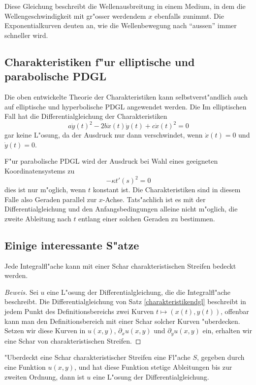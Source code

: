 Diese Gleichung beschreibt die Wellenausbreitung in einem Medium,
in dem die Wellengeschwindigkeit mit gr"osser werdendem $x$ ebenfalls
zunimmt. Die Exponentialkurven deuten an, wie die Wellenbewegung nach ``aussen''
immer schneller wird.

\subsection{Charakteristiken f"ur elliptische und parabolische PDGL}
Die oben entwickelte Theorie der Charakteristiken kann selbstverst"andlich
auch auf elliptische und hyperbolische PDGL angewendet werden. Die
Im elliptischen Fall hat die Differentialgleichung der Charakteristiken
\[
a\dot y(t)^2-2b\dot x(t)\dot y(t)+c\dot x(t)^2=0
\]
gar keine L"osung, da der Ausdruck nur dann verschwindet, wenn $\dot x(t)=0$
und $\dot y(t)=0$.

F"ur parabolische PDGL wird der Ausdruck bei Wahl eines geeigneten
Koordinatensystems zu
\[
-\kappa t'(s)^2=0
\]
dies ist nur m"oglich, wenn $t$ konstant ist. Die Charakteristiken
sind in diesem Falle also Geraden parallel zur $x$-Achse.
Tats"achlich ist es mit der Differentialgleichung und
den Anfangsbedingungen alleine nicht
m"oglich, die zweite Ableitung nach $t$ entlang einer solchen Geraden
zu bestimmen.

\subsection{Einige interessante S"atze}

\begin{satz}Jede Integralfl"ache kann mit einer Schar
charakteristischen Streifen bedeckt werden.
\end{satz}

\begin{proof}[Beweis]
Sei $u$ eine L"osung der Differentialgleichung, die die Integralfl"ache beschreibt.
Die Differentialgleichung von Satz \ref{charakteristikendgl}
beschreibt in jedem Punkt des Definitionsbereichs zwei Kurven $t\mapsto(x(t),y(t))$,
offenbar kann man den Definitionsbereich mit einer Schar solcher Kurven
"uberdecken.
Setzen wir diese Kurven in $u(x,y)$, $\partial_xu(x,y)$
und $\partial_yu(x,y)$ ein, erhalten wir eine Schar von charakteristischen
Streifen.
\end{proof}

\begin{satz}"Uberdeckt eine Schar charakteristischer Streifen
eine Fl"ache $S$, gegeben durch eine Funktion $u(x,y)$, und hat
diese Funktion stetige Ableitungen bis zur zweiten Ordnung,
dann ist $u$ eine L"osung der Differentialgleichung.
\end{satz}

